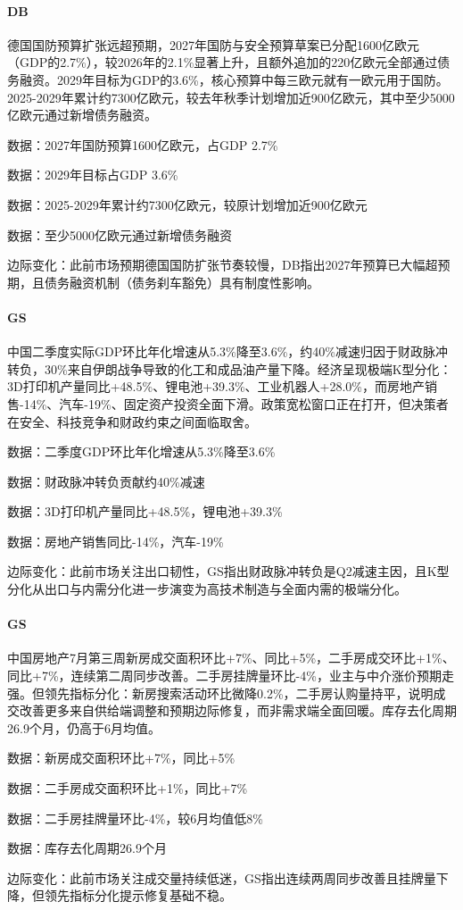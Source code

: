 \documentclass[11pt]{ctexart}
\begin{document}
\paragraph{DB} 德国国防预算扩张远超预期，2027年国防与安全预算草案已分配1600亿欧元（GDP的2.7\%），较2026年的2.1\%显著上升，且额外追加的220亿欧元全部通过债务融资。2029年目标为GDP的3.6\%，核心预算中每三欧元就有一欧元用于国防。2025-2029年累计约7300亿欧元，较去年秋季计划增加近900亿欧元，其中至少5000亿欧元通过新增债务融资。
{\small\color{refgray}数据：2027年国防预算1600亿欧元，占GDP 2.7\%\par}
{\small\color{refgray}数据：2029年目标占GDP 3.6\%\par}
{\small\color{refgray}数据：2025-2029年累计约7300亿欧元，较原计划增加近900亿欧元\par}
{\small\color{refgray}数据：至少5000亿欧元通过新增债务融资\par}
{\small\color{refgray}边际变化：此前市场预期德国国防扩张节奏较慢，DB指出2027年预算已大幅超预期，且债务融资机制（债务刹车豁免）具有制度性影响。\par}
\paragraph{GS} 中国二季度实际GDP环比年化增速从5.3\%降至3.6\%，约40\%减速归因于财政脉冲转负，30\%来自伊朗战争导致的化工和成品油产量下降。经济呈现极端K型分化：3D打印机产量同比+48.5\%、锂电池+39.3\%、工业机器人+28.0\%，而房地产销售-14\%、汽车-19\%、固定资产投资全面下滑。政策宽松窗口正在打开，但决策者在安全、科技竞争和财政约束之间面临取舍。
{\small\color{refgray}数据：二季度GDP环比年化增速从5.3\%降至3.6\%\par}
{\small\color{refgray}数据：财政脉冲转负贡献约40\%减速\par}
{\small\color{refgray}数据：3D打印机产量同比+48.5\%，锂电池+39.3\%\par}
{\small\color{refgray}数据：房地产销售同比-14\%，汽车-19\%\par}
{\small\color{refgray}边际变化：此前市场关注出口韧性，GS指出财政脉冲转负是Q2减速主因，且K型分化从出口与内需分化进一步演变为高技术制造与全面内需的极端分化。\par}
\paragraph{GS} 中国房地产7月第三周新房成交面积环比+7\%、同比+5\%，二手房成交环比+1\%、同比+7\%，连续第二周同步改善。二手房挂牌量环比-4\%，业主与中介涨价预期走强。但领先指标分化：新房搜索活动环比微降0.2\%，二手房认购量持平，说明成交改善更多来自供给端调整和预期边际修复，而非需求端全面回暖。库存去化周期26.9个月，仍高于6月均值。
{\small\color{refgray}数据：新房成交面积环比+7\%，同比+5\%\par}
{\small\color{refgray}数据：二手房成交面积环比+1\%，同比+7\%\par}
{\small\color{refgray}数据：二手房挂牌量环比-4\%，较6月均值低8\%\par}
{\small\color{refgray}数据：库存去化周期26.9个月\par}
{\small\color{refgray}边际变化：此前市场关注成交量持续低迷，GS指出连续两周同步改善且挂牌量下降，但领先指标分化提示修复基础不稳。\par}
\end{document}
